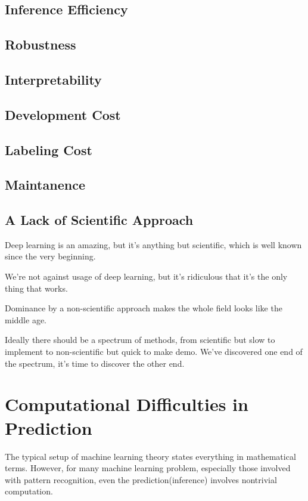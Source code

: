\documentclass[11pt]{article} 	%
\theoremstyle{definition}
\begin{document}
\subsection{Inference Efficiency}

\subsection{Robustness}

\subsection{Interpretability}

\subsection{Development Cost}

\subsection{Labeling Cost}

\subsection{Maintanence}

\subsection{A Lack of Scientific Approach}

Deep learning is an amazing, but it's anything but scientific, which is well known since the very beginning.

We're not against usage of deep learning, but it's ridiculous that it's the only thing that works.

Dominance by a non-scientific approach makes the whole field looks like the middle age.

Ideally there should be a spectrum of methods, from scientific but slow to implement to non-scientific but quick to make demo. We've discovered one end of the spectrum, it's time to discover the other end.




\section{Computational Difficulties in Prediction}

The typical setup of machine learning theory states everything in mathematical terms.
However, for many machine learning problem, especially those involved with pattern recognition, even the prediction(inference) involves nontrivial computation.
\end{document}
